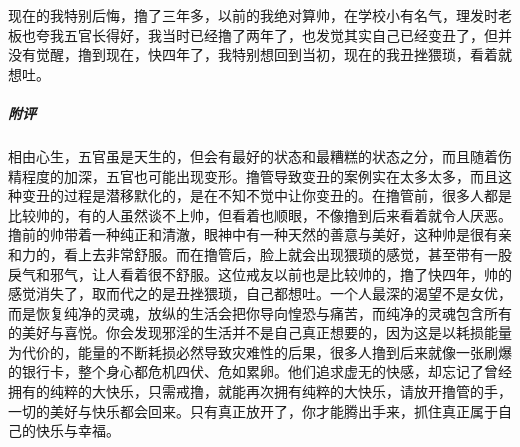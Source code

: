 \begin{case}
    现在的我特别后悔，撸了三年多，以前的我绝对算帅，在学校小有名气，理发时老板也夸我五官长得好，我当时已经撸了两年了，也发觉其实自己已经变丑了，但并没有觉醒，撸到现在，快四年了，我特别想回到当初，现在的我丑挫猥琐，看着就想吐。
    \subparagraph{附评} 相由心生，五官虽是天生的，但会有最好的状态和最糟糕的状态之分，而且随着伤精程度的加深，五官也可能出现变形。撸管导致变丑的案例实在太多太多，而且这种变丑的过程是潜移默化的，是在不知不觉中让你变丑的。在撸管前，很多人都是比较帅的，有的人虽然谈不上帅，但看着也顺眼，不像撸到后来看着就令人厌恶。撸前的帅带着一种纯正和清澈，眼神中有一种天然的善意与美好，这种帅是很有亲和力的，看上去非常舒服。而在撸管后，脸上就会出现猥琐的感觉，甚至带有一股戾气和邪气，让人看着很不舒服。这位戒友以前也是比较帅的，撸了快四年，帅的感觉消失了，取而代之的是丑挫猥琐，自己都想吐。一个人最深的渴望不是女优，而是恢复纯净的灵魂，放纵的生活会把你导向惶恐与痛苦，而纯净的灵魂包含所有的美好与喜悦。你会发现邪淫的生活并不是自己真正想要的，因为这是以耗损能量为代价的，能量的不断耗损必然导致灾难性的后果，很多人撸到后来就像一张刷爆的银行卡，整个身心都危机四伏、危如累卵。他们追求虚无的快感，却忘记了曾经拥有的纯粹的大快乐，只需戒撸，就能再次拥有纯粹的大快乐，请放开撸管的手，一切的美好与快乐都会回来。只有真正放开了，你才能腾出手来，抓住真正属于自己的快乐与幸福。
\end{case}


